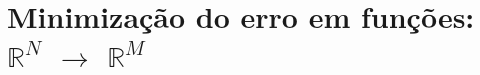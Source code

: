 
\chapter{Minimização do erro em funções: $\mathbb{R}^{N}$ $\rightarrow$ $\mathbb{R}^{M}$}



\newpage


\newpage


\newpage


\newpage


\newpage



\begin{comment}
\section{Minimização de $\frac{||\VECTOR{f}(\VECTOR{x})-\VECTOR{b}||^2}{||\VECTOR{b}||^2}$
$+\alpha\frac{||\VECTOR{x}-\VECTOR{q}||^2}{||\VECTOR{q}||^2}$  
}
\textcolor{red}{Inventado por mi ..., creo.}
\section{Minimização de $||\VECTOR{f}(\VECTOR{x})-\VECTOR{b}||_{\MATRIX{B}^{-2}}^2$
$+\alpha||\VECTOR{x}-\VECTOR{q}||_{\MATRIX{Q}^{-2}}^2$  
}
\textcolor{red}{Inventado por mi ..., creo Nenhun valor de $\VECTOR{b}$ ou $\VECTOR{q}$ pode ser zero.}
\end{comment}

